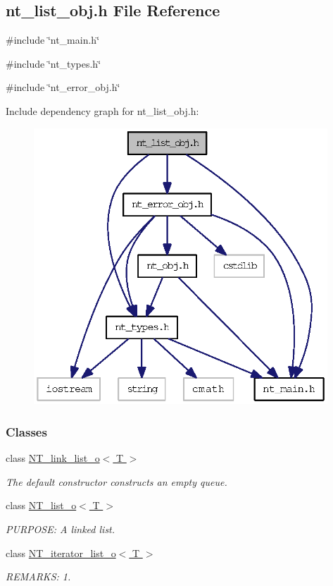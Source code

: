 \subsection{nt\_\-list\_\-obj.h File Reference}
\label{nt__list__obj_8h}
{\ttfamily \#include \char`\"{}nt\_\-main.h\char`\"{}}\par
{\ttfamily \#include \char`\"{}nt\_\-types.h\char`\"{}}\par
{\ttfamily \#include \char`\"{}nt\_\-error\_\-obj.h\char`\"{}}\par
Include dependency graph for nt\_\-list\_\-obj.h:
\nopagebreak
\begin{figure}[H]
\begin{center}
\leavevmode
\includegraphics[width=313pt]{nt__list__obj_8h__incl}
\end{center}
\end{figure}
\subsubsection*{Classes}
\begin{DoxyCompactItemize}
\item 
class \hyperlink{class_n_t__link__list__o}{NT\_\-link\_\-list\_\-o$<$ T $>$}
\begin{DoxyCompactList}\small\item\em The default constructor constructs an empty queue. \item\end{DoxyCompactList}\item 
class \hyperlink{class_n_t__list__o}{NT\_\-list\_\-o$<$ T $>$}
\begin{DoxyCompactList}\small\item\em PURPOSE: A linked list. \item\end{DoxyCompactList}\item 
class \hyperlink{class_n_t__iterator__list__o}{NT\_\-iterator\_\-list\_\-o$<$ T $>$}
\begin{DoxyCompactList}\small\item\em REMARKS: 1. \item\end{DoxyCompactList}\end{DoxyCompactItemize}
